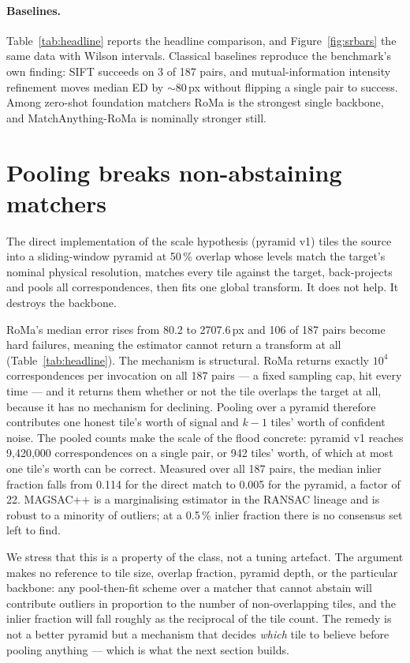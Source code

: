 \documentclass[10pt]{article}
\begin{document}
\paragraph{Baselines.} Table~\ref{tab:headline} reports the headline comparison, and Figure~\ref{fig:srbars} the same data with Wilson intervals. Classical baselines reproduce the benchmark's own finding: SIFT \citep{lowe2004sift} succeeds on 3 of 187 pairs, and mutual-information intensity refinement \citep{maes1997mutualinfo} moves median ED by ${\sim}80$\,px without flipping a single pair to success. Among zero-shot foundation matchers RoMa is the strongest single backbone, and MatchAnything-RoMa is nominally stronger still.

\section{Pooling breaks non-abstaining matchers}
\label{sec:v1}

The direct implementation of the scale hypothesis (pyramid v1) tiles the source into a sliding-window pyramid at 50\,\% overlap whose levels match the target's nominal physical resolution, matches every tile against the target, back-projects and pools all correspondences, then fits one global transform. It does not help. It destroys the backbone.

RoMa's median error rises from 80.2 to 2707.6\,px and 106 of 187 pairs become hard failures, meaning the estimator cannot return a transform at all (Table~\ref{tab:headline}). The mechanism is structural. RoMa returns exactly $10^4$ correspondences per invocation on all 187 pairs --- a fixed sampling cap, hit every time --- and it returns them whether or not the tile overlaps the target at all, because it has no mechanism for declining. Pooling over a pyramid therefore contributes one honest tile's worth of signal and $k-1$ tiles' worth of confident noise. The pooled counts make the scale of the flood concrete: pyramid v1 reaches 9{,}420{,}000 correspondences on a single pair, or 942 tiles' worth, of which at most one tile's worth can be correct. Measured over all 187 pairs, the median inlier fraction falls from 0.114 for the direct match to 0.005 for the pyramid, a factor of 22. MAGSAC++ is a marginalising estimator in the RANSAC lineage \citep{fischler1981ransac,barath2020magsac} and is robust to a minority of outliers; at a 0.5\,\% inlier fraction there is no consensus set left to find.

We stress that this is a property of the class, not a tuning artefact. The argument makes no reference to tile size, overlap fraction, pyramid depth, or the particular backbone: any pool-then-fit scheme over a matcher that cannot abstain will contribute outliers in proportion to the number of non-overlapping tiles, and the inlier fraction will fall roughly as the reciprocal of the tile count. The remedy is not a better pyramid but a mechanism that decides \emph{which} tile to believe before pooling anything --- which is what the next section builds.
\end{document}
